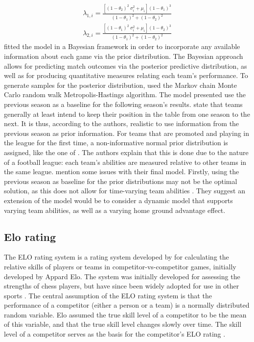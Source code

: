 \begin{equation}
    \begin{aligned}
        \lambda_{1, i} = \frac{[(1 - \theta_{2})^{2}\ \sigma_{i}^{2} + \mu_{i}] (1 - \theta_{1})^{3}}{(1 - \theta_{1})^{2} + (1 - \theta_{2})^{2}} \\
        \lambda_{2, i} = \frac{[(1 - \theta_{1})^{2}\ \sigma_{i}^{2} + \mu_{i}] (1 - \theta_{2})^{3}}{(1 - \theta_{1})^{2} + (1 - \theta_{2})^{2}}
    \end{aligned}    
    \label{eq:shahtahmassebi-moyeed-lambda}
\end{equation}
\citet{bib:shahtahmassebi-moyeed-2016} fitted the model in a Bayesian framework in order to incorporate any available information about each game via the prior distribution. The Bayesian approach allows for predicting match outcomes via the posterior predictive distribution, as well as for producing quantitative measures relating each team's performance. To generate samples for the posterior distribution, \citet{bib:shahtahmassebi-moyeed-2016} used the Markov chain Monte Carlo random walk Metropolis-Hastings algorithm. The model presented use the previous season as a baseline for the following season's results. \citet{bib:shahtahmassebi-moyeed-2016} state that teams generally at least intend to keep their position in the table from one season to the next. It is thus, according to the authors, realistic to use information from the previous season as prior information. For teams that are promoted and playing in the league for the first time, a non-informative normal prior distribution is assigned, like the one of \citet{bib:karlis-ntzoufras-2008}. The authors explain that this is done due to the nature of a football league: each team's abilities are measured relative to other teams in the same league. \citet{bib:shahtahmassebi-moyeed-2016} mention some issues with their final model. Firstly, using the previous season as baseline for the prior distributions may not be the optimal solution, as this does not allow for time-varying team abilities \citep{bib:shahtahmassebi-moyeed-2016}. They suggest an extension of the model would be to consider a dynamic model that supports varying team abilities, as well as a varying home ground advantage effect.

\subsection{Elo rating}

The ELO rating system is a rating system developed by for calculating the relative skills of players or teams in competitor-vs-competitor games, initially developed by Appard Elo. The system was initially developed for assessing the strengths of chess players, but have since been widely adopted for use in other sports \citep{bib:chessbase-2007}. The central assumption of the ELO rating system is that the performance of a competitor (either a person or a team) is a normally distributed random variable. Elo assumed the true skill level of a competitor to be the mean of this variable, and that the true skill level changes slowly over time. The skill level of a competitor serves as the basis for the competitor's ELO rating \citep{bib:chessbase-2007}.

